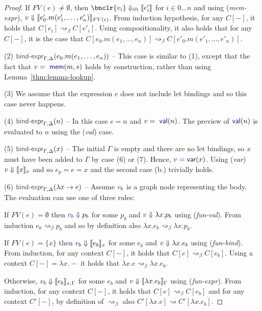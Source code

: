 \documentclass[acmsmall,anonymous,fleqn]{acmart}\settopmatter{printfolios=false,printccs=false,printacmref=false}
\theoremstyle{plain}
\theoremstyle{definition}
\newcommand{\ident}[1]{\textnormal{\textcolor{idclr}{\sffamily #1}}}
\newcommand{\bndclr}[1]{\textcolor{kvdclr}{#1}}
\newcommand{\bnd}[1]{\textnormal{\textcolor{kvdclr}{\sffamily #1}}}
\begin{document}
\begin{proof}
  If $FV(e)\neq\emptyset$, then $\bnclr{v_i} \Downarrow_\ident{lift} \llbracket e'_i \rrbracket$ for $i\in 0\ldots n$ and
  using (\emph{mem-expr}), $\bndclr{v}\Downarrow \llbracket e'_0.m(e'_1, \ldots, e'_n) \rrbracket_{FV(e)}$.
  From induction hypothesis, for any $C[-]$, it holds that $C[e_i] \rightsquigarrow_\beta C[e'_i]$.
  Using compositionality, it also holds that for any $C[-]$, it is the case that
  $C[e_0.m(e_1, \ldots, e_n)] \rightsquigarrow_\beta C[e'_0.m(e'_1, \ldots, e'_n)]$.

\newpage
\vspace{0.75em}\noindent(2) $\ident{bind-expr}_{\Gamma, \Delta}(e_0.m(e_1, \ldots, e_n))$ --
  This case is similar to (1), except that the fact that $\bndclr{v} = \bnd{mem}(m, s)$
  holds by construction, rather than using Lemma~\ref{thm:lemma-lookup}.

\vspace{0.75em}\noindent(3) We assume that the expression $e$ does not include let bindings and
  so this case never happens.

\vspace{0.75em}\noindent(4) $\ident{bind-expr}_{\Gamma, \Delta}(n)$ -- In this case $e=n$ and $\bndclr{v} = \bnd{val}(n)$. The preview of
  $\bnd{val}(n)$ is evaluated to $n$ using the (\emph{val}) case.

\vspace{0.75em}\noindent(5) $\ident{bind-expr}_{\Gamma, \Delta}(x)$ -- The initial $\Gamma$ is empty and
  there are no let bindings, so $x$ must have been added to $\Gamma$ by case (6) or (7). Hence,
  $\bndclr{v}=\bnd{var}(x)$. Using (\emph{var}) $\bndclr{v}\Downarrow \llbracket x \rrbracket_{x}$
  and so $e_p = e = x$ and the second case (b.) trivially holds.

\vspace{0.75em}\noindent(6) $\ident{bind-expr}_{\Gamma, \Delta}(\lambda x\rightarrow e)$ -- Assume
  $\bndclr{v_b}$ is a graph node representing the body. The evaluation can use one of three rules:

  If $FV(e)=\emptyset$ then $\bndclr{v_b}\Downarrow p_b$ for some $p_b$ and $\bndclr{v}\Downarrow \lambda x.p_b$
  using (\emph{fun-val}). From induction $e_b \rightsquigarrow_\beta p_b$
  and so by definition also $\lambda x.e_b \rightsquigarrow_\beta \lambda x.p_b$.

  If $FV(e)=\{x\}$ then $\bndclr{v_b}\Downarrow \llbracket e_b \rrbracket_x$ for some $e_b$ and
  $\bndclr{v}\Downarrow \lambda x.e_b$ using (\emph{fun-bind}). From
  induction, for any context $C[-]$, it holds that $C[e] \rightsquigarrow_\beta C[e_b]$.
  Using a context $C[-]=\lambda x.-$ it holds that $\lambda x.e \rightsquigarrow_\beta \lambda x.e_b$.

  Otherwise, $\bndclr{v_b}\Downarrow \llbracket e_b \rrbracket_{x,\Gamma}$ for some $e_b$ and
  $\bndclr{v}\Downarrow \llbracket\lambda x.e_b\rrbracket_\Gamma$ using (\emph{fun-expr}). From
  induction, for any context $C[-]$, it holds that $C[e] \rightsquigarrow_\beta C[e_b]$
  and for any context $C'[-]$, by definition of $\rightsquigarrow_\beta$ also
  $C'[\lambda x.e] \rightsquigarrow C'[\lambda x.e_b]$.
\end{proof}
\end{document}
